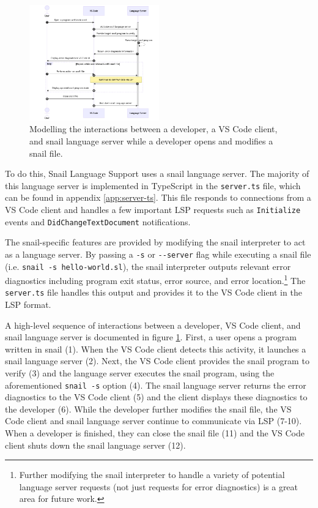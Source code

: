 \documentclass{article}
\begin{document}
\begin{figure}
    \includegraphics[width=0.5\textwidth]{png/lsp-sequence.png}
    \caption{
        \centering
            Modelling the interactions between a developer, a VS Code client, and snail language server while a developer opens and modifies a snail file.
    }
    \label{fig:lsp-sequence}
\end{figure}

To do this, Snail Language Support uses a snail language server. The majority of this language server is implemented in TypeScript in the \lstinline{server.ts} file, which can be found in appendix \ref{app:server-ts}. This file responds to connections from a VS Code client and handles a few important LSP requests such as \lstinline{Initialize} events and \lstinline{DidChangeTextDocument} notifications.

The snail-specific features are provided by modifying the snail interpreter to act as a language server. By passing a \lstinline{-s} or \lstinline{--server} flag while executing a snail file (i.e. \lstinline{snail -s hello-world.sl}), the snail interpreter outputs relevant error diagnostics including program exit status, error source, and error location.\footnote{Further modifying the snail interpreter to handle a variety of potential language server requests (not just requests for error diagnostics) is a great area for future work.} The \lstinline{server.ts} file handles this output and provides it to the VS Code client in the LSP format.

A high-level sequence of interactions between a developer, VS Code client, and snail language server is documented in figure \ref{fig:lsp-sequence}. First, a user opens a program written in snail (1). When the VS Code client detects this activity, it launches a snail language server (2). Next, the VS Code client provides the snail program to verify (3) and the language server executes the snail program, using the aforementioned \lstinline{snail -s} option (4). The snail language server returns the error diagnostics to the VS Code client (5) and the client displays these diagnostics to the developer (6). While the developer further modifies the snail file, the VS Code client and snail language server continue to communicate via LSP (7-10). When a developer is finished, they can close the snail file (11) and the VS Code client shuts down the snail language server (12). 
\end{document}
